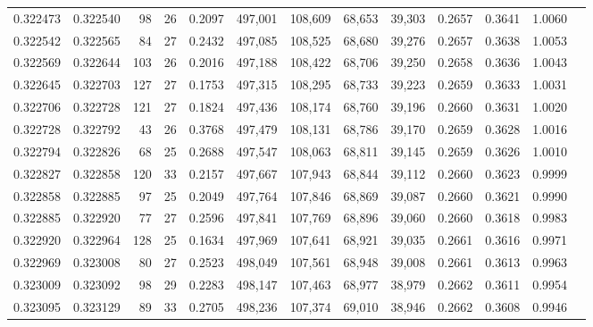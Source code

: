 \begin{tabular}{rrrrrrrrrrrrr}
0.322473 & 0.322540 &    98 &  26 &                                     0.2097 & 497,001 & 108,609 &  68,653 &  39,303 & 0.2657 & 0.3641 & 1.0060 \\
0.322542 & 0.322565 &    84 &  27 &                                     0.2432 & 497,085 & 108,525 &  68,680 &  39,276 & 0.2657 & 0.3638 & 1.0053 \\
0.322569 & 0.322644 &   103 &  26 &                                     0.2016 & 497,188 & 108,422 &  68,706 &  39,250 & 0.2658 & 0.3636 & 1.0043 \\
0.322645 & 0.322703 &   127 &  27 &                                     0.1753 & 497,315 & 108,295 &  68,733 &  39,223 & 0.2659 & 0.3633 & 1.0031 \\
0.322706 & 0.322728 &   121 &  27 &                                     0.1824 & 497,436 & 108,174 &  68,760 &  39,196 & 0.2660 & 0.3631 & 1.0020 \\
0.322728 & 0.322792 &    43 &  26 &                                     0.3768 & 497,479 & 108,131 &  68,786 &  39,170 & 0.2659 & 0.3628 & 1.0016 \\
0.322794 & 0.322826 &    68 &  25 &                                     0.2688 & 497,547 & 108,063 &  68,811 &  39,145 & 0.2659 & 0.3626 & 1.0010 \\
0.322827 & 0.322858 &   120 &  33 &                                     0.2157 & 497,667 & 107,943 &  68,844 &  39,112 & 0.2660 & 0.3623 & 0.9999 \\
0.322858 & 0.322885 &    97 &  25 &                                     0.2049 & 497,764 & 107,846 &  68,869 &  39,087 & 0.2660 & 0.3621 & 0.9990 \\
0.322885 & 0.322920 &    77 &  27 &                                     0.2596 & 497,841 & 107,769 &  68,896 &  39,060 & 0.2660 & 0.3618 & 0.9983 \\
0.322920 & 0.322964 &   128 &  25 &                                     0.1634 & 497,969 & 107,641 &  68,921 &  39,035 & 0.2661 & 0.3616 & 0.9971 \\
0.322969 & 0.323008 &    80 &  27 &                                     0.2523 & 498,049 & 107,561 &  68,948 &  39,008 & 0.2661 & 0.3613 & 0.9963 \\
0.323009 & 0.323092 &    98 &  29 &                                     0.2283 & 498,147 & 107,463 &  68,977 &  38,979 & 0.2662 & 0.3611 & 0.9954 \\
0.323095 & 0.323129 &    89 &  33 &                                     0.2705 & 498,236 & 107,374 &  69,010 &  38,946 & 0.2662 & 0.3608 & 0.9946 \\

\end{tabular}
